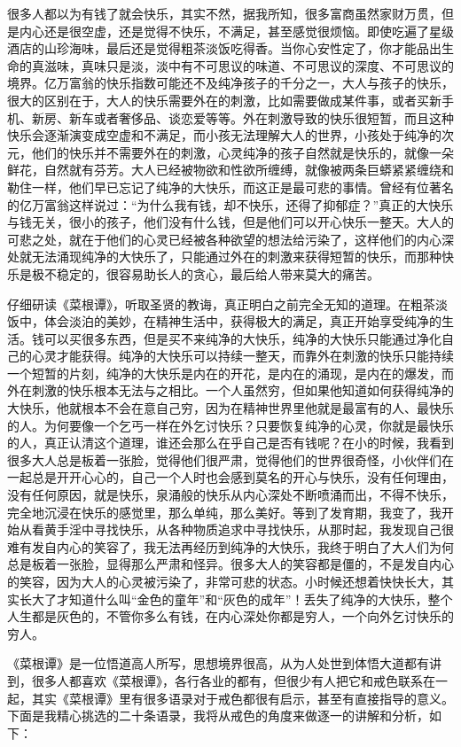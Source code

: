 很多人都以为有钱了就会快乐，其实不然，据我所知，很多富商虽然家财万贯，但是内心还是很空虚，还是觉得不快乐，不满足，甚至感觉很烦恼。即使吃遍了星级酒店的山珍海味，最后还是觉得粗茶淡饭吃得香。当你心安性定了，你才能品出生命的真滋味，真味只是淡，淡中有不可思议的味道、不可思议的深度、不可思议的境界。亿万富翁的快乐指数可能还不及纯净孩子的千分之一，大人与孩子的快乐，很大的区别在于，大人的快乐需要外在的刺激，比如需要做成某件事，或者买新手机、新房、新车或者奢侈品、谈恋爱等等。外在刺激导致的快乐很短暂，而且这种快乐会逐渐演变成空虚和不满足，而小孩无法理解大人的世界，小孩处于纯净的次元，他们的快乐并不需要外在的刺激，心灵纯净的孩子自然就是快乐的，就像一朵鲜花，自然就有芬芳。大人已经被物欲和性欲所缠缚，就像被两条巨蟒紧紧缠绕和勒住一样，他们早已忘记了纯净的大快乐，而这正是最可悲的事情。曾经有位著名的亿万富翁这样说过：“为什么我有钱，却不快乐，还得了抑郁症？”真正的大快乐与钱无关，很小的孩子，他们没有什么钱，但是他们可以开心快乐一整天。大人的可悲之处，就在于他们的心灵已经被各种欲望的想法给污染了，这样他们的内心深处就无法涌现纯净的大快乐了，只能通过外在的刺激来获得短暂的快乐，而那种快乐是极不稳定的，很容易助长人的贪心，最后给人带来莫大的痛苦。

仔细研读《菜根谭》，听取圣贤的教诲，真正明白之前完全无知的道理。在粗茶淡饭中，体会淡泊的美妙，在精神生活中，获得极大的满足，真正开始享受纯净的生活。钱可以买很多东西，但是买不来纯净的大快乐，纯净的大快乐只能通过净化自己的心灵才能获得。纯净的大快乐可以持续一整天，而靠外在刺激的快乐只能持续一个短暂的片刻，纯净的大快乐是内在的开花，是内在的涌现，是内在的爆发，而外在刺激的快乐根本无法与之相比。一个人虽然穷，但如果他知道如何获得纯净的大快乐，他就根本不会在意自己穷，因为在精神世界里他就是最富有的人、最快乐的人。为何要像一个乞丐一样在外乞讨快乐？只要恢复纯净的心灵，你就是最快乐的人，真正认清这个道理，谁还会那么在乎自己是否有钱呢？在小的时候，我看到很多大人总是板着一张脸，觉得他们很严肃，觉得他们的世界很奇怪，小伙伴们在一起总是开开心心的，自己一个人时也会感到莫名的开心与快乐，没有任何理由，没有任何原因，就是快乐，泉涌般的快乐从内心深处不断喷涌而出，不得不快乐，完全地沉浸在快乐的感觉里，那么单纯，那么美好。等到了发育期，我变了，我开始从看黄手淫中寻找快乐，从各种物质追求中寻找快乐，从那时起，我发现自己很难有发自内心的笑容了，我无法再经历到纯净的大快乐，我终于明白了大人们为何总是板着一张脸，显得那么严肃和怪异。很多大人的笑容都是僵的，不是发自内心的笑容，因为大人的心灵被污染了，非常可悲的状态。小时候还想着快快长大，其实长大了才知道什么叫“金色的童年”和“灰色的成年”！丢失了纯净的大快乐，整个人生都是灰色的，不管你多么有钱，在内心深处你都是穷人，一个向外乞讨快乐的穷人。

《菜根谭》是一位悟道高人所写，思想境界很高，从为人处世到体悟大道都有讲到，很多人都喜欢《菜根谭》，各行各业的都有，但很少有人把它和戒色联系在一起，其实《菜根谭》里有很多语录对于戒色都很有启示，甚至有直接指导的意义。下面是我精心挑选的二十条语录，我将从戒色的角度来做逐一的讲解和分析，如下：

